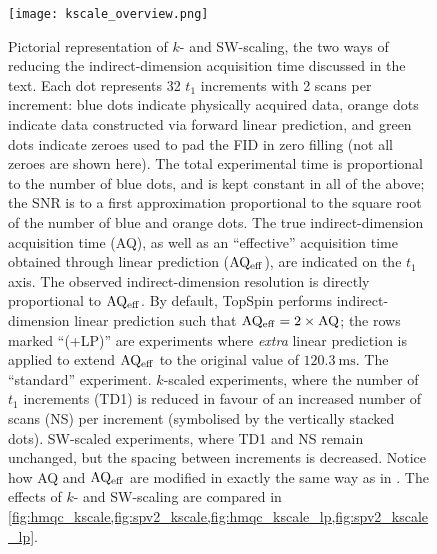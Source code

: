 \begin{figure}
    \centering
    \texttt{[image: kscale\_overview.png]}
    {\label{fig:kscale_overview_std}}
    {\label{fig:kscale_overview_k}}
    {\label{fig:kscale_overview_sw}}
    \caption{
        Pictorial representation of $k$- and SW-scaling, the two ways of reducing the indirect-dimension acquisition time discussed in the text.
        Each dot represents 32 $t_1$ increments with 2 scans per increment: blue dots indicate physically acquired data, orange dots indicate data constructed via forward linear prediction, and green dots indicate zeroes used to pad the FID in zero filling (not all zeroes are shown here).
        The total experimental time is proportional to the number of blue dots, and is kept constant in all of the above; the SNR is to a first approximation proportional to the square root of the number of blue and orange dots.
        The true indirect-dimension acquisition time (AQ), as well as an ``effective'' acquisition time obtained through linear prediction ($\mathrm{AQ_{eff}}$), are indicated on the $t_1$ axis.
        The observed indirect-dimension resolution is directly proportional to $\mathrm{AQ_{eff}}$.
        By default, TopSpin performs indirect-dimension linear prediction such that $\mathrm{AQ_{eff}} = 2 \times \mathrm{AQ}$; the rows marked ``(+LP)'' are experiments where \textit{extra} linear prediction is applied to extend $\mathrm{AQ_{eff}}$ to the original value of $\SI{120.3}{\ms}$.
        \textbf{} The ``standard'' experiment.
        \textbf{} $k$-scaled experiments, where the number of $t_1$ increments (TD1) is reduced in favour of an increased number of scans (NS) per increment (symbolised by the vertically stacked dots).
        \textbf{} SW-scaled experiments, where TD1 and NS remain unchanged, but the spacing between increments is decreased.
        Notice how AQ and $\mathrm{AQ_{eff}}$ are modified in exactly the same way as in .
        The effects of $k$- and SW-scaling are compared in \cref{fig:hmqc_kscale,fig:spv2_kscale,fig:hmqc_kscale_lp,fig:spv2_kscale_lp}.
    }
    \label{fig:kscale_overview}
\end{figure}

